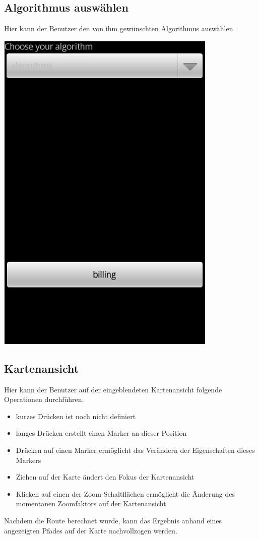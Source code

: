 \documentclass[a4paper,10pt,titlepage]{article}
\begin{document}
\subsection{Algorithmus auswählen}
Hier kann der Benutzer den von ihm gewünschten Algorithmus auswählen.
\begin {center}
\includegraphics[scale=0.47]{media/android/algorithms.jpg}
\end {center}

\newpage
\subsection{Kartenansicht}
Hier kann der Benutzer auf der eingeblendeten Kartenansicht folgende Operationen durchführen.
\begin {itemize}
\item kurzes Drücken ist noch nicht definiert
\item langes Drücken erstellt einen Marker an dieser Position
\item Drücken auf einen Marker ermöglicht das Verändern der Eigenschaften dieses Markers
\item Ziehen auf der Karte ändert den Fokus der Kartenansicht
\item Klicken auf einen der Zoom-Schaltflächen ermöglicht die Änderung des momentanen Zoomfaktors auf der Kartenansicht 
\end {itemize}
Nachdem die Route berechnet wurde, kann das Ergebnis anhand eines angezeigten Pfades auf der Karte nachvollzogen werden.
\end{document}
